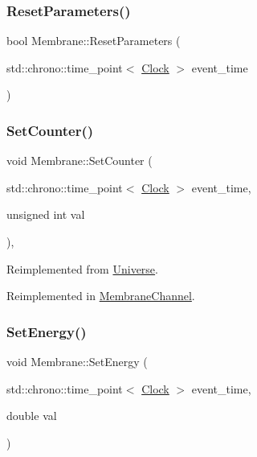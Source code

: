 \mbox{\label{classMembrane_a9c49462cf63495381a52e2defc80b1e4}} 
\subsubsection{\texorpdfstring{Reset\+Parameters()}{ResetParameters()}}
{\footnotesize\ttfamily bool Membrane\+::\+Reset\+Parameters (\begin{DoxyParamCaption}\item[{std\+::chrono\+::time\+\_\+point$<$ \mbox{\hyperlink{universe_8h_a0ef8d951d1ca5ab3cfaf7ab4c7a6fd80}{Clock}} $>$}]{event\+\_\+time }\end{DoxyParamCaption})}

\mbox{\label{classMembrane_a4bff43b38d7046867f220392a39cc272}} 
\subsubsection{\texorpdfstring{Set\+Counter()}{SetCounter()}}
{\footnotesize\ttfamily void Membrane\+::\+Set\+Counter (\begin{DoxyParamCaption}\item[{std\+::chrono\+::time\+\_\+point$<$ \mbox{\hyperlink{universe_8h_a0ef8d951d1ca5ab3cfaf7ab4c7a6fd80}{Clock}} $>$}]{event\+\_\+time,  }\item[{unsigned int}]{val }\end{DoxyParamCaption})\hspace{0.3cm}{\ttfamily [inline]}, {\ttfamily [virtual]}}



Reimplemented from \mbox{\hyperlink{classUniverse_aa22202ae740eb1355529afcb13285e91}{Universe}}.



Reimplemented in \mbox{\hyperlink{classMembraneChannel_a61931feff8f3bb485eeb5c80125bb732}{Membrane\+Channel}}.

\mbox{\label{classMembrane_a37beeb28761af644bc3a51d3509f14f1}} 
\subsubsection{\texorpdfstring{Set\+Energy()}{SetEnergy()}}
{\footnotesize\ttfamily void Membrane\+::\+Set\+Energy (\begin{DoxyParamCaption}\item[{std\+::chrono\+::time\+\_\+point$<$ \mbox{\hyperlink{universe_8h_a0ef8d951d1ca5ab3cfaf7ab4c7a6fd80}{Clock}} $>$}]{event\+\_\+time,  }\item[{double}]{val }\end{DoxyParamCaption})\hspace{0.3cm}{\ttfamily [inline]}}

